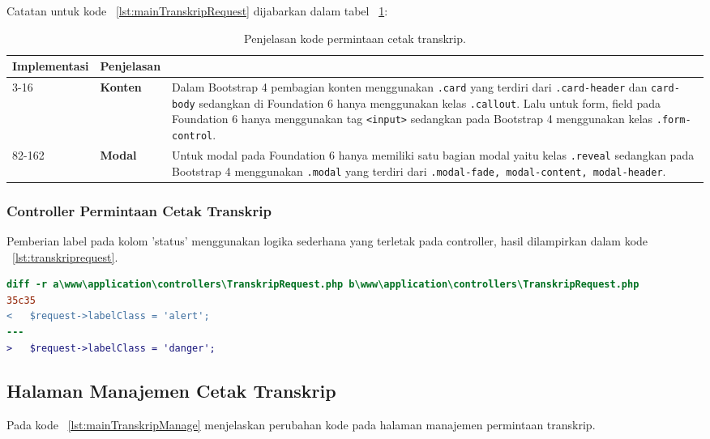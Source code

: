 \noindent Catatan untuk kode ~\ref{lst:mainTranskripRequest} dijabarkan dalam tabel ~\ref{table:kodePermintaanCetakTranskrip}:
\begin{table}[H]
	\centering
	\caption{Penjelasan kode permintaan cetak transkrip.}
	\label{table:kodePermintaanCetakTranskrip}
	\begin{tabularx}{\textwidth}{llX}
		\toprule
		Implementasi     & Penjelasan \\
		\midrule
		3-16 & \textbf{Konten} & Dalam Bootstrap 4 pembagian konten menggunakan \texttt{.card} yang terdiri dari \texttt{.card-header} dan \texttt{card-body} sedangkan di Foundation 6 hanya menggunakan kelas \texttt{.callout}. Lalu untuk form, field pada Foundation 6 hanya menggunakan tag \texttt{<input>} sedangkan pada Bootstrap 4 menggunakan kelas \texttt{.form-control}.\\
		82-162 & \textbf{Modal} & Untuk modal pada Foundation 6 hanya memiliki satu bagian modal yaitu kelas \texttt{.reveal} sedangkan pada Bootstrap 4 menggunakan \texttt{.modal} yang terdiri dari \texttt{.modal-fade, modal-content, modal-header}.\\
		\bottomrule
	\end{tabularx}%
\end{table}

\subsubsection{Controller Permintaan Cetak Transkrip}
Pemberian label pada kolom 'status' menggunakan logika sederhana yang terletak pada controller, hasil dilampirkan dalam kode ~\ref{lst:transkriprequest}.
\begin{lstlisting}[language=diff, caption=Perubahan file \www\application\controllers\TranskripRequest.php,  basicstyle=\ttfamily, frame=single,
columns=fullflexible, keepspaces=true, breaklines=true, label={lst:transkriprequest}]
diff -r a\www\application\controllers\TranskripRequest.php b\www\application\controllers\TranskripRequest.php
35c35
<   $request->labelClass = 'alert';
---
>   $request->labelClass = 'danger';
\end{lstlisting}

\subsection{Halaman Manajemen Cetak Transkrip} 
Pada kode ~\ref{lst:mainTranskripManage} menjelaskan perubahan kode pada halaman manajemen permintaan transkrip.

